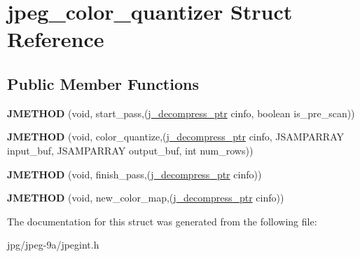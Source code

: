 \hypertarget{structjpeg__color__quantizer}{\section{jpeg\+\_\+color\+\_\+quantizer Struct Reference}
\label{structjpeg__color__quantizer}
}
\subsection*{Public Member Functions}
\begin{DoxyCompactItemize}
\item 
\hypertarget{structjpeg__color__quantizer_a3296d9d04a267c50808154ce6bdcef1b}{{\bfseries J\+M\+E\+T\+H\+O\+D} (void, start\+\_\+pass,(\hyperlink{structjpeg__decompress__struct}{j\+\_\+decompress\+\_\+ptr} cinfo, boolean is\+\_\+pre\+\_\+scan))}\label{structjpeg__color__quantizer_a3296d9d04a267c50808154ce6bdcef1b}

\item 
\hypertarget{structjpeg__color__quantizer_ac11184c8e0fdc9c0ec200c0fab197b5f}{{\bfseries J\+M\+E\+T\+H\+O\+D} (void, color\+\_\+quantize,(\hyperlink{structjpeg__decompress__struct}{j\+\_\+decompress\+\_\+ptr} cinfo, J\+S\+A\+M\+P\+A\+R\+R\+A\+Y input\+\_\+buf, J\+S\+A\+M\+P\+A\+R\+R\+A\+Y output\+\_\+buf, int num\+\_\+rows))}\label{structjpeg__color__quantizer_ac11184c8e0fdc9c0ec200c0fab197b5f}

\item 
\hypertarget{structjpeg__color__quantizer_abb5268c27447bc9ae1876c5fffa94081}{{\bfseries J\+M\+E\+T\+H\+O\+D} (void, finish\+\_\+pass,(\hyperlink{structjpeg__decompress__struct}{j\+\_\+decompress\+\_\+ptr} cinfo))}\label{structjpeg__color__quantizer_abb5268c27447bc9ae1876c5fffa94081}

\item 
\hypertarget{structjpeg__color__quantizer_a9531395d8c6f914f57bea01ff2b2c5b4}{{\bfseries J\+M\+E\+T\+H\+O\+D} (void, new\+\_\+color\+\_\+map,(\hyperlink{structjpeg__decompress__struct}{j\+\_\+decompress\+\_\+ptr} cinfo))}\label{structjpeg__color__quantizer_a9531395d8c6f914f57bea01ff2b2c5b4}

\end{DoxyCompactItemize}


The documentation for this struct was generated from the following file\+:\begin{DoxyCompactItemize}
\item 
jpg/jpeg-\/9a/jpegint.\+h\end{DoxyCompactItemize}
